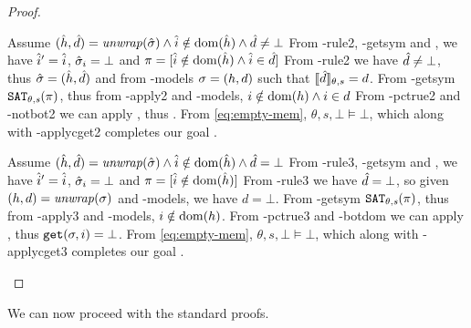 \begin{proof}
\begin{hypvlist}
 Assume $(\hat{h},\hat{d})={\operatorname{\mathit{unwrap}}}(\hat{\sigma}) \land \hat{i}\notin\operatorname{dom}(\hat{h}) \land \hat{d}\neq\bot$
 From \hyp{rule2}, \hyp{getsym} and , we have $\hat{i}'=\hat{i}$, $\hat{\sigma}_i=\bot$ and ${\pi=[\hat{i}\notin \operatorname{dom}(\hat{h})\land \hat{i} \in \hat{d}]}$%
 From \hyp{rule2} we have $\hat{d}\neq\bot$, thus $\hat{\sigma}=(\hat{h},\hat{d})$ and from \hyp{models} $\sigma=(h,d)$ such that $\llbracket\hat{d}\rrbracket_{\theta,s} = d$.
 From \hyp{getsym} $\texttt{SAT}_{\mathit{\theta,s}}(\pi)$, thus from \hyp{apply2} and \hyp{models}, $i\notin \operatorname{dom}(h) \land i\in d$
 From \hyp{pctrue2} and \hyp{notbot2} we can apply , thus .
 From \ref{eq:empty-mem}, $\theta,s,\bot\models\bot$, which along with \hyp{applycget2} completes our goal .
\end{hypvlist}


\begin{hypvlist}
 Assume $(\hat{h},\hat{d})={\operatorname{\mathit{unwrap}}}(\hat{\sigma}) \land \hat{i}\notin \operatorname{dom}(\hat{h}) \land \hat{d}=\bot$
 From \hyp{rule3}, \hyp{getsym} and , we have $\hat{i}'=\hat{i}$, $\hat{\sigma}_i=\bot$ and ${\pi=[\hat{i}\notin \operatorname{dom}(\hat{h})]}$
 From \hyp{rule3} we have $\hat{d}=\bot$, so given $(h,d)={\operatorname{\mathit{unwrap}}}(\sigma)$ and \hyp{models}, we have $d=\bot$.%
 From \hyp{getsym} $\texttt{SAT}_{\mathit{\theta,s}}(\pi)$, thus from \hyp{apply3} and \hyp{models}, $i\notin \operatorname{dom}(h)$.
 From \hyp{pctrue3} and \hyp{botdom} we can apply , thus ${\texttt{get}(\sigma,i)=\bot}$.%
 From \ref{eq:empty-mem}, $\theta,s,\bot\models\bot$, which along with \hyp{applycget3} completes our goal .
\end{hypvlist}
\end{proof}

We can now proceed with the standard proofs.

